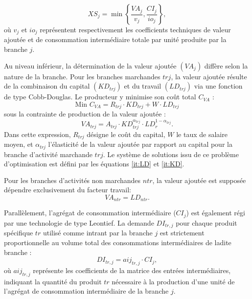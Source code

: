 \documentclass[11pt,a4paper]{article}
\newcommand{\aij}{\mathit{aij}}
\newcommand{\io}{\mathit{io}}
\newcommand{\ntr}{\mathit{ntr}}
\newcommand{\tr}{\mathit{tr}}
\newcommand{\trj}{\mathit{trj}}
\newcommand{\CI}{\mathit{CI}}
\newcommand{\DI}{\mathit{DI}}
\newcommand{\KD}{\mathit{KD}}
\newcommand{\LD}{\mathit{LD}}
\newcommand{\VA}{\mathit{VA}}
\newcommand{\XS}{\mathit{XS}}
\begin{document}
	\begin{equation*}
		\XS_{j} = \min\left\{\frac{\VA_{j}}{v_{j}},\frac{\CI_{j}}{\io_{j}}\right\}, 
	\end{equation*}	
	où $v_{j}$ et $\io_{j}$ représentent respectivement les coefficients techniques de valeur ajoutée et de consommation intermédiaire totale par unité produite par la branche $j$.
	
	Au niveau inférieur, la détermination de la valeur ajoutée $\left(\VA_{j}\right)$ diffère selon la nature de la branche. Pour les {branches marchandes} $\trj$, la valeur ajoutée résulte de la combinaison du capital $\left(\KD_{\trj}\right)$ et du travail $\left(\LD_{\trj}\right)$ via une fonction de type Cobb-Douglas. Le producteur y minimise son coût total $C_{\VA}$ :
	\begin{equation*}
		\text{Min } C_{\VA} = R_{\trj} \cdot \KD_{\trj} + W \cdot \LD_{\trj}
	\end{equation*}
	sous la contrainte de production de la valeur ajoutée :
	\begin{equation*}
		\VA_{\trj} = A_{\trj} \cdot \KD_{\trj}^{\alpha_{\trj}} \cdot \LD_{r}^{1-\alpha_{\trj}}.
	\end{equation*}
	Dans cette expression, $R_{\trj}$ désigne le coût du capital, $W$ le taux de salaire moyen, et $\alpha_{\trj}$ l'élasticité de la valeur ajoutée par rapport au capital pour la branche d'activité marchande $\trj$. Le système de solutions issu de ce problème d'optimisation est défini par les équations \ref{it:LD} et \ref{it:KD}.
	
	Pour les branches d'activités non marchandes $\ntr$, la valeur ajoutée est supposée dépendre exclusivement du facteur travail:
	\begin{equation*}
		\VA_{\ntr} =\LD_{\ntr}.
	\end{equation*}
	
	
	Parallèlement, l'agrégat de consommation intermédiaire ($\CI_{j}$) est également régi par une technologie de type Leontief. La demande $\DI_{\tr,j}$ pour chaque produit spécifique $\tr$ utilisé comme intrant par la branche $j$ est strictement proportionnelle au volume total des consommations intermédiaires de ladite branche :
	\begin{equation*}
		\DI_{\tr,j} = \aij_{\tr,j}\cdot \CI_j,
	\end{equation*}
	où $\aij_{\tr,j}$ représente les coefficients de la matrice des entrées intermédiaires, indiquant la quantité du produit $\tr$ nécessaire à la production d'une unité de l'agrégat de consommation intermédiaire de la branche $j$. 
	
\end{document}
